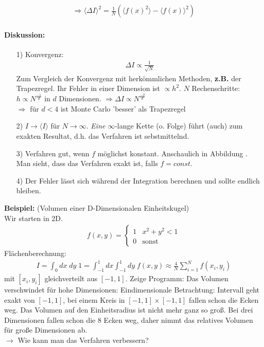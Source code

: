 \documentclass[12pt]{article}
\begin{document}
\begin{align*}
 \Rightarrow \langle \Delta I \rangle ^2= \frac{1}{N} \left( \langle f(x)^2 \rangle - \langle f(x) \rangle^2 \right)
\end{align*}
\paragraph{Diskussion:} \begin{itemize}
\item[1)] Konvergenz:
\begin{align}
\Delta I \propto \frac{1}{\sqrt{N}}
\end{align}
Zum Vergleich der Konvergenz mit herkömmlichen Methoden, \textbf{z.B.} der Trapezregel. Ihr Fehler in einer Dimension ist $\propto h^2 $. $N$ Rechenschritte: $h \propto N^{ \frac{-1}{d} }$ in $d$ Dimensionen. $\Rightarrow \Delta I \propto N^{\frac{-2}{d}}$\\
$ \Rightarrow$ für $d<4$ ist Monte Carlo 'besser' als Trapezregel

\item[2)] $I \to \langle I \rangle$ für $N \to \infty$. \textit{Eine} $\infty$-lange Kette (o. Folge) führt (auch) zum exakten Resultat, d.h. das Verfahren ist sebstmittelnd.

\item[3)] Verfahren gut, wenn $f$ möglichst konstant.  Anschaulich in Abbildung . Man sieht, dass das Verfahren exakt ist, falls $f= const.$ %
\item[4)]Der Fehler lässt sich während der Integration berechnen und sollte endlich bleiben.
\end{itemize}
\textbf{Beispiel:} (Volumen einer D-Dimensionalen Einheitskugel) \\
Wir starten in 2D. %
\begin{align*}
f(x,y)=
\begin{cases}
1 & x^2+y^2 <1 \\
0 & \mbox{sonst}
\end{cases}
\end{align*}
Flächenberechnung: 
\begin{align*}
I= \int_0 dx \; dy \; 1 = \int_{-1}^1 dx \int_{-1}^1 dy \; f(x,y) 
\approx \frac{4}{N} \sum_{i=1}^N f(x_i,y_i)
\end{align*}
mit $[x_i, y_i]$ gleichverteilt aus $[-1,1]$.
Zeige Programm: Das Volumen verschwindet für hohe Dimensionen: Eindimensionale Betrachtung: Intervall geht exakt von $[-1,1]$, bei einem Kreis in $[-1,1] \times [-1,1]$ fallen schon die Ecken weg. Das Volumen auf den Einheitsradius ist nicht mehr ganz so groß. Bei drei Dimensionen fallen schon die 8 Ecken weg, daher nimmt das relatives Volumen für große Dimensionen ab. \\
$\to$ Wie kann man das Verfahren verbessern?
\end{document}
